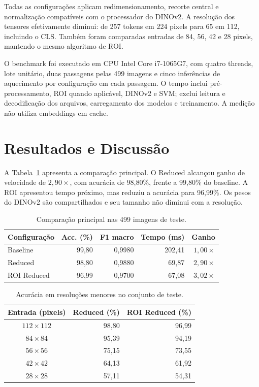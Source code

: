 \documentclass[conference]{IEEEtran}
\begin{document}
Todas as configurações aplicam redimensionamento, recorte central e
normalização compatíveis com o processador do DINOv2. A resolução dos
tensores efetivamente diminui: de 257 tokens em 224 pixels para 65 em
112, incluindo o CLS. Também foram comparadas entradas de 84, 56,
42 e 28 pixels, mantendo o mesmo algoritmo de ROI.

O benchmark foi executado em CPU Intel Core i7-1065G7, com quatro
threads, lote unitário, duas passagens pelas 499 imagens e cinco
inferências de aquecimento por configuração em cada passagem.
O tempo inclui pré-processamento, ROI quando aplicável, DINOv2 e SVM;
exclui leitura e decodificação dos arquivos, carregamento dos modelos
e treinamento. A medição não utiliza embeddings em cache.

\section{Resultados e Discussão}
A Tabela~\ref{tab:principal} apresenta a comparação principal.
O Reduced alcançou ganho de velocidade de $2{,}90\times$, com acurácia
de 98,80\%, frente a 99,80\% do baseline. A ROI apresentou tempo
próximo, mas reduziu a acurácia para 96,99\%. Os pesos do DINOv2 são
compartilhados e seu tamanho não diminui com a resolução.

\begin{table}[t]
\caption{Comparação principal nas 499 imagens de teste.}
\label{tab:principal}
\centering
\footnotesize
\setlength{\tabcolsep}{4pt}
\begin{tabular}{lrrrr}
\toprule
Configuração & Acc. (\%) & F1 macro & Tempo (ms) & Ganho \\
\midrule
Baseline    & 99,80 & 0,9980 & 202,41 & $1{,}00\times$ \\
Reduced     & 98,80 & 0,9880 & 69,87  & $2{,}90\times$ \\
ROI Reduced & 96,99 & 0,9700 & 67,08  & $3{,}02\times$ \\
\bottomrule
\end{tabular}
\end{table}

\begin{table}[t]
\caption{Acurácia em resoluções menores no conjunto de teste.}
\label{tab:resolucoes}
\centering
\small
\begin{tabular}{crr}
\toprule
Entrada (pixels) & Reduced (\%) & ROI Reduced (\%) \\
\midrule
$112\times112$ & 98,80 & 96,99 \\
$84\times84$   & 95,39 & 94,19 \\
$56\times56$   & 75,15 & 73,55 \\
$42\times42$   & 64,13 & 61,92 \\
$28\times28$   & 57,11 & 54,31 \\
\bottomrule
\end{tabular}
\end{table}
\end{document}
